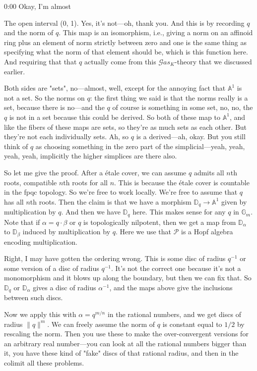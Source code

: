 \begin{unfinished}{0:00}
Okay, I'm almost

The open interval (0, 1). Yes, it's not---oh, thank you. And this is by recording $q$ and the norm of $q$. This map is an isomorphism, i.e., giving a norm on an affinoid ring plus an element of norm strictly between zero and one is the same thing as specifying what the norm of that element should be, which is this function here. And requiring that that $q$ actually come from this $\mathcal{G}as_{K}$-theory that we discussed earlier.

Both sides are "sets", no---almost, well, except for the annoying fact that $\mathbb{A}^{1}$ is not a set. So the norms on $q$: the first thing we said is that the norms really is a set, because there is no---and the $q$ of course is something in some set, no, no, the $q$ is not in a set because this could be derived. So both of these map to $\mathbb{A}^{1}$, and like the fibers of these maps are sets, so they're as much sets as each other. But they're not each individually sets. Ah, so $q$ is a derived---ah, okay. But you still think of $q$ as choosing something in the zero part of the simplicial---yeah, yeah, yeah, yeah, implicitly the higher simplices are there also.

So let me give the proof. After a \'{e}tale cover, we can assume $q$ admits all $n$th roots, compatible $n$th roots for all $n$. This is because the \'{e}tale cover is countable in the fpqc topology. So we're free to work locally. We're free to assume that $q$ has all $n$th roots. Then the claim is that we have a morphism $\mathbb{D}_{q} \to \mathbb{A}^{1}$ given by multiplication by $q$. And then we have $\mathbb{D}_{q}$ here. This makes sense for any $q$ in $\mathbb{G}_{m}$. Note that if $\alpha = q \cdot \beta$ or $q$ is topologically nilpotent, then we get a map from $\mathbb{D}_{\alpha}$ to $\mathbb{D}_{\beta}$ induced by multiplication by $q$. Here we use that $\mathcal{P}$ is a Hopf algebra encoding multiplication.

Right, I may have gotten the ordering wrong. This is some disc of radius $q^{-1}$ or some version of a disc of radius $q^{-1}$. It's not the correct one because it's not a monomorphism and it blows up along the boundary, but then we can fix that. So $\mathbb{D}_{q}$ or $\mathbb{D}_{\alpha}$ gives a disc of radius $\alpha^{-1}$, and the maps above give the inclusions between such discs.

Now we apply this with $\alpha = q^{m/n}$ in the rational numbers, and we get discs of radius $\|q\|^{m}$. We can freely assume the norm of $q$ is constant equal to $1/2$ by rescaling the norm. Then you use these to make the over-convergent versions for an arbitrary real number---you can look at all the rational numbers bigger than it, you have these kind of "fake" discs of that rational radius, and then in the colimit all these problems.



\end{unfinished}
